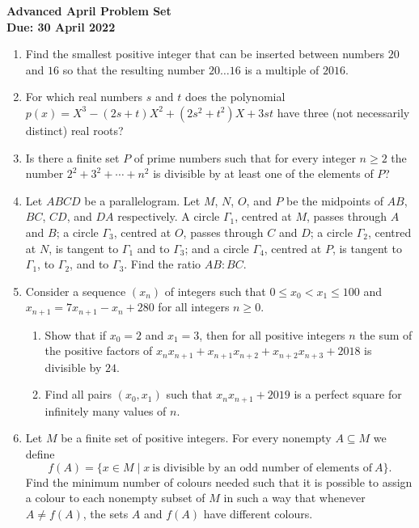 \documentclass{article}
\begin{document}
\thispagestyle{empty}

\begin{center}
  \textbf{\Large Advanced April Problem Set}
  \\ \vspace{1em}
  \textbf{\large Due: 30 April 2022}
\end{center}

\bigskip

\begin{enumerate}[itemsep=12pt]

\item %
Find the smallest positive integer that can be inserted between numbers $20$ and $16$ so that the resulting number $20 \dots 16$ is a multiple of $2016$.


\item %
For which real numbers $s$ and $t$ does the polynomial $p(x) = X^3 -(2s+t)X^2 +(2s^2+t^2)X +3st$ have three (not necessarily distinct) real roots?


\item %
Is there a finite set $P$ of prime numbers such that for every integer $n \geq 2$ the number $2^2 +3^2 +\dotsb +n^2$ is divisible by at least one of the elements of $P$?


\item %
Let $ABCD$ be a parallelogram.
Let $M$, $N$, $O$, and $P$ be the midpoints of $AB$, $BC$, $CD$, and $DA$ respectively.
A circle $\Gamma_1$, centred at $M$, passes through $A$ and $B$; a circle $\Gamma_3$, centred at $O$, passes through $C$ and $D$; a circle $\Gamma_2$, centred at $N$, is tangent to $\Gamma_1$ and to $\Gamma_3$; and a circle $\Gamma_4$, centred at $P$, is tangent to $\Gamma_1$, to $\Gamma_2$, and to $\Gamma_3$.
Find the ratio $AB:BC$.


\item %
Consider a sequence $(x_n)$ of integers such that $0 \leq x_0 < x_1 \leq 100$ and $x_{n+1} = 7x_{n+1} -x_n +280$ for all integers $n \geq 0$.
\begin{enumerate}
	\item Show that if $x_0 = 2$ and $x_1 = 3$, then for all positive integers $n$ the sum of the positive factors of $x_n x_{n+1} +x_{n+1}x_{n+2} +x_{n+2}x_{n+3} +2018$ is divisible by $24$.
	\item Find all pairs $(x_0,x_1)$ such that $x_n x_{n+1} +2019$ is a perfect square for infinitely many values of $n$.
\end{enumerate}


\item %
Let $M$ be a finite set of positive integers.
For every nonempty $A \subseteq M$ we define
\[ f(A) = \{x \in M \mid x \ \text{is divisible by an odd number of elements of} \ A\}. \]
Find the minimum number of colours needed such that it is possible to assign a colour to each nonempty subset of $M$ in such a way that whenever $A \neq f(A)$, the sets $A$ and $f(A)$ have different colours.

\end{enumerate}
\end{document}
